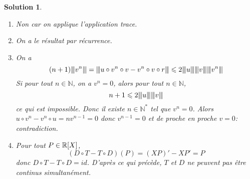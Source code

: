 \documentclass[12pt]{article}
\newtheorem{solution}{Solution}[section]
\theoremstyle{remark}
\newcommand{\N}{\mathbb{N}} \newcommand{\Z}{\mathbb{Z}}
\newcommand{\vertiii}[1]{{\left\vert\kern-0.25ex\left\vert\kern-0.25ex\left\vert{}#1
\right\vert\kern-0.25ex\right\vert\kern-0.25ex\right\vert}}
\numberwithin{equation}{section}
\begin{document}
\begin{solution}
	\phantom{}
	\begin{enumerate}
		\item Non car on applique l'application trace.
		\item On a le résultat par récurrence.
		\item On a 
		$$(n+1)\vertiii{v^{n}}=\vertiii{u\circ v^{n}\circ v-v^{n}\circ v\circ r}\leqslant 2\vertiii{u}\vertiii{v}\vertiii{v^{n}}$$
		Si pour tout $n\in\N$, on a $v^{n}=0$, alors pour tout $n\in\N$,
		$$n+1\leqslant 2\vertiii{u}\vertiii{v}$$
		ce qui est impossible. Donc il existe $n\in\N^{*}$ tel que $v^{n}=0$. Alors $u\circ v^{n}-v^{n}\circ u=nv^{n-1}=0$ donc $v^{n-1}=0$ et de proche en proche $v=0$: contradiction.
		\item Pour tout $P\in\mathbb{R}[X]$, 
		$$(D\circ T-T\circ D)(P)=(XP)'-XP'=P$$
		donc $D\circ T-T\circ D=id$. D'après ce qui précède, $T$ et $D$ ne peuvent pas être continus simultanément.
	\end{enumerate}
\end{solution}
\end{document}
